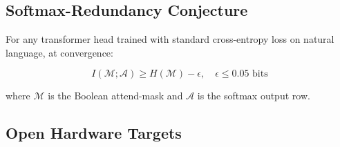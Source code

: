\subsection{Softmax-Redundancy Conjecture}











\begin{conjecture}





\label{conj:softmax-redundancy}





For any transformer head trained with standard cross-entropy loss on natural language, at convergence:





\[





I(\mathcal{M}; \mathcal{A}) \ge H(\mathcal{M}) - \epsilon, \quad \epsilon \le 0.05 \text{ bits}





\]





where $\mathcal{M}$ is the Boolean attend-mask and $\mathcal{A}$ is the softmax output row.





\end{conjecture}











\subsection{Open Hardware Targets}











